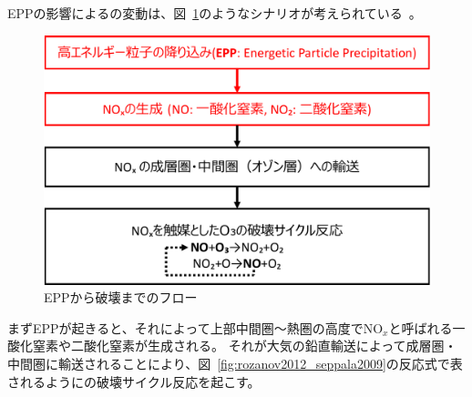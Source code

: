 EPPの影響によるの変動は、図~\ref{fig:epp_to_ozone_flow}のようなシナリオが考えられている~\cite{rozanov2012influence}。
\begin{figure}[htbp]
    \centering
    \includegraphics[width=\linewidth]{master_thesis_contents/master_thesis_fig/epp_to_ozone_flow.pdf}
    \caption{EPPから破壊までのフロー}
    \label{fig:epp_to_ozone_flow}
\end{figure}
まずEPPが起きると、それによって上部中間圏〜熱圏の高度で$\mathrm{NO}_x$と呼ばれる一酸化窒素や二酸化窒素が生成される。
それが大気の鉛直輸送によって成層圏・中間圏に輸送されることにより、図~\ref{fig:rozanov2012_seppala2009}の反応式で表されるようにの破壊サイクル反応を起こす。


